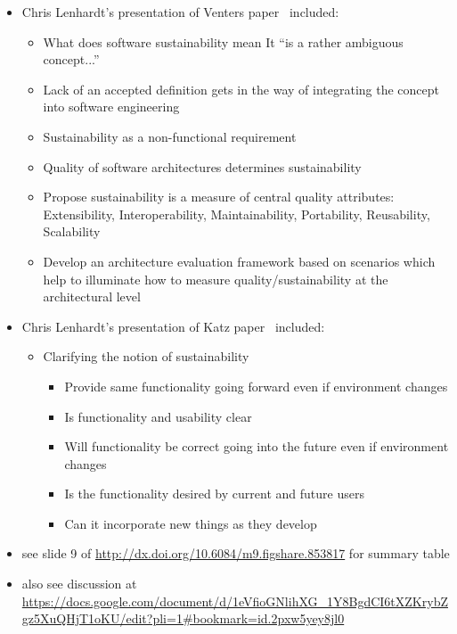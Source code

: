 \documentclass[11pt, oneside]{amsart}
\begin{document}
\begin{itemize}
\item Chris Lenhardt's presentation of Venters
  paper~\cite{Venters_WSSSPE} included:

\begin{itemize}
\item What does software sustainability mean
It ``is a rather ambiguous concept...''
\item Lack of an accepted definition gets in the way of integrating
  the concept into software engineering
\item Sustainability as a non-functional requirement
\item Quality of software architectures determines sustainability
\item Propose sustainability is a measure of central quality
  attributes: Extensibility, Interoperability, Maintainability,
  Portability, Reusability, Scalability
\item Develop an architecture evaluation framework based on scenarios
  which help to illuminate how to measure quality/sustainability at
  the architectural level
\end{itemize}

\item Chris Lenhardt's presentation of Katz paper~\cite{Katz_WSSSPE}
  included:
\begin{itemize}
\item Clarifying the notion of sustainability
\begin{itemize}
\item Provide same functionality going forward even if environment changes
\item Is functionality and usability clear
\item Will functionality be correct going into the future even if
  environment changes
\item Is the functionality desired by current and future users
\item Can it incorporate new things as they develop
\end{itemize}
\end{itemize}

\item see slide 9 of
  \url{http://dx.doi.org/10.6084/m9.figshare.853817} for summary table

\item also see discussion at \url{https://docs.google.com/document/d/1eVfioGNlihXG_1Y8BgdCI6tXZKrybZgz5XuQHjT1oKU/edit?pli=1#bookmark=id.2pxw5yey8jl0}

\end{itemize}
\end{document}
